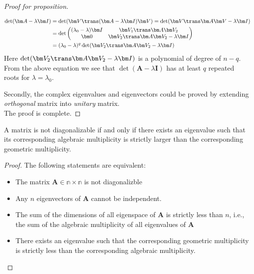 \begin{proof}[Proof for proposition]
\begin{itemize}
\begin{align*}
\det(\bm A-\lambda\bm I)&=
\det(\bm V\trans(\bm A-\lambda\bm I)\bm V)
=\det(\bm V\trans\bm A\bm V-\lambda\bm I)\\
&=\det\begin{pmatrix}
(\lambda_0-\lambda)\bm I
&
\bm V_1\trans\bm A\bm V_2\\
\bm0&
\bm V_2\trans\bm A\bm V_2-\lambda\bm I
\end{pmatrix}\\
&=(\lambda_0-\lambda)^q\det(\bm V_2\trans\bm A\bm V_2-\lambda\bm I)
\end{align*}
Here $\det(\bm V_2\trans\bm A\bm V_2-\lambda\bm I)$ is a polynomial of degree of $n-q$. From the above equation we see that $\det(\bm A-\lambda\bm I)$ has at least $q$ repeated roots for $\lambda=\lambda_0$.
\end{itemize}
Secondly, the complex eigenvalues and eigenvectors could be proved by extending \emph{orthogonal} matrix into \emph{unitary} matrix.\\
The proof is complete.
\end{proof}
\begin{proposition}
A matrix is not diagonalizable if and only if there exists an eigenvalue such that its corresponding algebraic multiplicity is strictly larger than the corresponding geometric multiplicity.
\end{proposition}
\begin{proof}
The following statements are equivalent:
\begin{itemize}
\item
The matrix $\bm A\in\mathbb{n\times n}$ is not diagonalizble
\item
Any $n$ eigenvectors of $\bm A$ cannot be independent.
\item
The sum of the dimensions of all eigenspace of $\bm A$ is strictly less than $n$, i.e., the sum of the algebraic multiplicity of all eigenvalues of $\bm A$
\item
There exists an eigenvalue such that the corresponding geometric multiplicity is strictly less than the corresponding algebraic multiplicity.



\end{itemize}
\end{proof}














